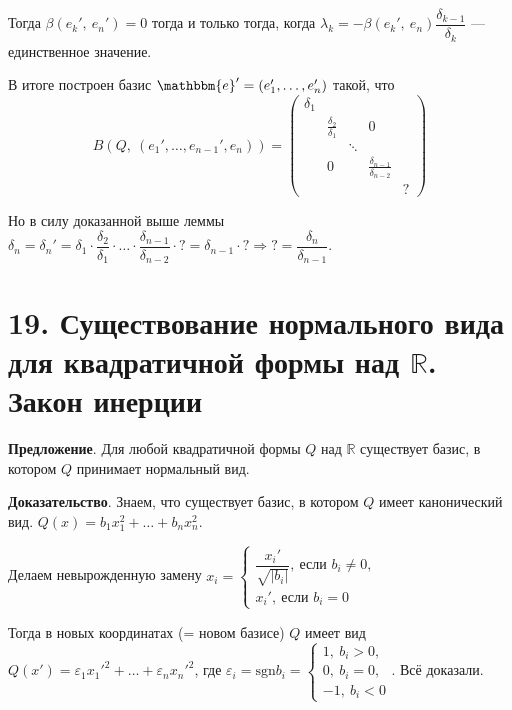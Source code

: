 \documentclass[a4paper, 12pt]{article}
\newcommand{\R}{\mathbb{R}}
\newcommand{\me}{\mathbbm{e}}
\begin{document}
Тогда $\beta(e_k',\ e_n') = 0$ тогда и только тогда, когда $\lambda_k = -\beta(e_k',\ e_n) \dfrac{\delta_{k - 1}}{\delta_k}$ --- единственное значение.

В итоге построен базис $\me' = (e_1', \ldots, e_n')$ такой, что
\vspace{-3mm}
\[
B(Q,\ (e_1', \ldots, e_{n - 1}', e_n)) =
\begin{pmatrix}
\delta_1 &                           &        &                                       &   \\
& \frac{\delta_2}{\delta_1} &        &                 0                     &   \\
&                           & \ddots &                                       &   \\
&           0               &        & \frac{\delta_{n - 1}}{\delta_{n - 2}} &   \\
&                           &        &                                       & ?
\end{pmatrix}
\]

\vspace{-3mm}
Но в силу доказанной выше леммы $\delta_n = \delta_n' = \delta_1 \cdot \dfrac{\delta_2}{\delta_1} \cdot \ldots \cdot \dfrac{\delta_{n - 1}}{\delta_{n - 2}} \cdot ? = \delta_{n - 1} \cdot ? \Longrightarrow ? = \dfrac{\delta_n}{\delta_{n - 1}}$.

\section*{19. Существование нормального вида для квадратичной формы над $\R$. Закон инерции}
\textbf{Предложение}. Для любой квадратичной формы $Q$ над $\R$ существует базис, в котором $Q$ принимает нормальный вид.

\textbf{Доказательство}. Знаем, что существует базис, в котором $Q$ имеет канонический вид. $Q(x) = b_1x_1^2 + \ldots + b_nx_n^2$.

Делаем невырожденную замену $x_i =
\begin{cases*}
\dfrac{x_i'}{\sqrt{|b_i|}},\ \text{если } b_i \neq 0, \\
x_i',\ \text{если } b_i = 0
\end{cases*}$

Тогда в новых координатах (= новом базисе) $Q$ имеет вид $Q(x') = \varepsilon_1x_1'^2 + \ldots + \varepsilon_nx_n'^2$, где $\varepsilon_i = \text{sgn}b_i = 
\begin{cases*}
1,\ b_i > 0, \\
0,\ b_i = 0, \\
-1,\ b_i < 0
\end{cases*}$. Всё доказали.
\end{document}
